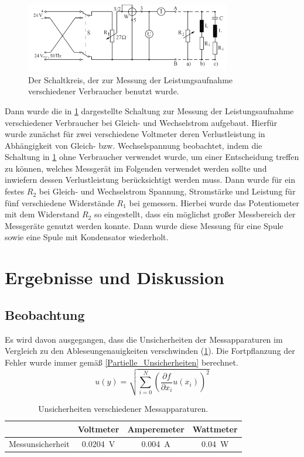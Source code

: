 \documentclass[
	a4paper,
	12pt,
	pagesize,
	ngerman
]{scrartcl}
\begin{document}
	\begin{figure}[tb]
		\includegraphics[width=0.8\textwidth]{Schaltkreis2}
		\centering
		\caption{Der Schaltkreis, der zur Messung der Leistungsaufnahme verschiedener Verbraucher benutzt wurde.}
		\label{SK2}
		\centering
	\end{figure}
	
	Dann wurde die in \cref{SK2} dargestellte Schaltung zur Messung der Leistungsaufnahme verschiedener Verbraucher bei Gleich- und Wechselstrom aufgebaut.
	Hierfür wurde zunächst für zwei verschiedene Voltmeter deren Verlustleistung in Abhängigkeit von Gleich- bzw. Wechselspannung beobachtet, indem die Schaltung in \cref{SK2} ohne Verbraucher verwendet wurde, um einer Entscheidung treffen zu können, welches Messgerät im Folgenden verwendet werden sollte und inwiefern dessen Verlustleistung berücksichtigt werden muss.
	Dann wurde für ein festes $ R_2 $ bei Gleich- und Wechselstrom Spannung, Stromstärke und Leistung für fünf verschiedene Widerstände $ R_1 $ bei gemessen.
	Hierbei wurde das Potentiometer mit dem Widerstand $ R_2 $ so eingestellt, dass ein möglichst großer Messbereich der Messgeräte genutzt werden konnte.
	Dann wurde diese Messung für eine Spule sowie eine Spule mit Kondensator wiederholt. 
	
	\section{Ergebnisse und Diskussion}
	\subsection{Beobachtung}
	Es wird davon ausgegangen, dass die Unsicherheiten der Messapparaturen im Vergleich zu den Ableseungenauigkeiten verschwinden (\cref{Tabelle_Unsicherheiten}).
	Die Fortpflanzung der Fehler wurde immer gemäß \cref{Partielle_Unsicherheiten} berechnet.
	\begin{equation}
		u(y) = \sqrt{  \sum_{i=0}^{N} \left( \frac{\partial f}{\partial x_i}u(x_i)\right)^2  }
		\label{Partielle_Unsicherheiten}
	\end{equation}
	\begin{table}[tb]
		\centering
		\begin{tabular}{ r | c | c | c}
			& Voltmeter & Amperemeter & Wattmeter \\ \hline 
			 Messunsicherheit& \SI{0,0204}{V}&  \SI{0,004}{A}&  \SI{0,04}{W}\\

		\end{tabular}
		\caption{Unsicherheiten verschiedener Messapparaturen.}
		\label{Tabelle_Unsicherheiten} 
	\end{table}
	
\end{document}
